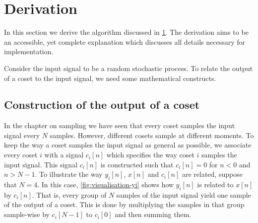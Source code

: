 \documentclass[a4paper, openany, oneside]{memoir}
\begin{document}
\section{Derivation}
\label{sec:reconstruction-derivation}
In this section we derive the algorithm discussed in \cref{sec:reconstruction-derivation}. The derivation aims to be an accessible, yet complete explanation which discusses all details necessary for implementation.

Consider the input signal to be a random stochastic process. To relate the output of a coset to the input signal, we need some mathematical constructs.

\subsection{Construction of the output of a coset}
In the chapter on sampling we have seen that every coset samples the input signal every $N$ samples. However, different cosets sample at different moments. To keep the way a coset samples the input signal as general as possible, we associate every coset $i$ with a signal $c_i[n]$ which specifies the way coset $i$ samples the input signal. This signal $c_i[n]$ is constructed such that $c_i[n] = 0$ for $n < 0$ and $n > N-1$. To illustrate the way $y_i[n]$, $x[n]$ and $c_i[n]$ are related, suppose that $N=4$. In this case, \cref{fig:visualisation-yi} shows how $y_i[n]$ is related to $x[n]$ by $c_i[n]$. That is, every group of $N$ samples of the input signal yield one sample of the output of a coset. This is done by multiplying the samples in that group sample-wise by $c_i[N-1]$ to $c_i[0]$ and then summing them.
\end{document}
